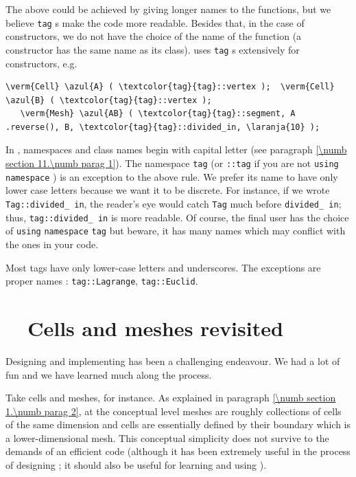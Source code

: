 The above could be achieved by giving longer names to the functions, but we believe
{\small\tt\textcolor{tag}{tag}}\hskip0.8pt s make the code more readable.
Besides that, in the case of constructors, we do not have the choice of the name of the function
(a constructor has the same name as its class).
{\ManiFEM} uses {\small\tt\textcolor{tag}{tag}}\hskip0.8pt s extensively for constructors, e.g.
\begin{Verbatim}[commandchars=\\\{\},formatcom=\small\tt,baselinestretch=0.94]
   \verm{Cell} \azul{A} ( \textcolor{tag}{tag}::vertex );  \verm{Cell} \azul{B} ( \textcolor{tag}{tag}::vertex );
   \verm{Mesh} \azul{AB} ( \textcolor{tag}{tag}::segment, A .reverse(), B, \textcolor{tag}{tag}::divided_in, \laranja{10} );
\end{Verbatim}

In \maniFEM, namespaces and class names begin with capital letter
(see paragraph \ref{\numb section 11.\numb parag 1}).
The namespace {\small\tt\textcolor{tag}{tag}} (or {\small\tt{}::tag} if you are not
{\small\tt using} {\small\tt namespace} {\small\tt{}}) is an exception
to the above rule.
We prefer its name to have only lower case letters because we want it to be
discrete. For instance, if we wrote {\small\tt\textcolor{tag}{Tag}::divided\_\,in},
the reader's eye would catch {\small\tt\textcolor{tag}{Tag}} much before
{\small\tt divided\_\,in};
thus, {\small\tt\textcolor{tag}{tag}::divided\_\,in} is more readable.
Of course, the final user has the choice of {\small\tt using} {\small\tt namespace}
{\small\tt\textcolor{tag}{tag}} but beware, it has many names which may conflict
with the ones in your code.

Most tags have only lower-case letters and underscores.
The exceptions are proper names : {\small\tt \textcolor{tag}{tag}::Lagrange},
{\small\tt \textcolor{tag}{tag}::Euclid}.


\section{~~Cells and meshes revisited}\label{\numb section 11.\numb parag 4}

Designing and implementing {\maniFEM} has been a challenging endeavour.
We had a lot of fun and we have learned much along the process.

Take cells and meshes, for instance.
As explained in paragraph \ref{\numb section 1.\numb parag 2}, at the conceptual level meshes
are roughly collections of cells of the same dimension and cells are essentially
defined by their boundary which is a lower-dimensional mesh.
This conceptual simplicity does not survive to the demands of an efficient code
(although it has been extremely useful in the process of designing \maniFEM;
it should also be useful for learning and using \maniFEM).


